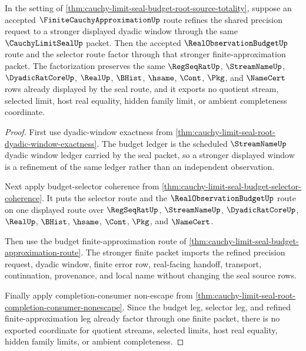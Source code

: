 \begin{theorem}
\label{thm:cauchy-limit-seal-root-budget-finite-approximation-cofinality}
In the setting of \autoref{thm:cauchy-limit-seal-budget-root-source-totality}, suppose an accepted $\FiniteCauchyApproximationUp$ route refines the shared precision request to a stronger displayed dyadic window through the same $\CauchyLimitSealUp$ packet. Then the accepted $\RealObservationBudgetUp$ route and the selector route factor through that stronger finite-approximation packet. The factorization preserves the same $\RegSeqRatUp$, $\StreamNameUp$, $\DyadicRatCoreUp$, $\RealUp$, $\BHist$, $\hsame$, $\Cont$, $\Pkg$, and $\NameCert$ rows already displayed by the seal route, and it exports no quotient stream, selected limit, host real equality, hidden family limit, or ambient completeness coordinate.
\end{theorem}
\begin{proof}
First use dyadic-window exactness from \autoref{thm:cauchy-limit-seal-root-dyadic-window-exactness}. The budget ledger is the scheduled $\StreamNameUp$ dyadic window ledger carried by the seal packet, so a stronger displayed window is a refinement of the same ledger rather than an independent observation.

Next apply budget-selector coherence from \autoref{thm:cauchy-limit-seal-budget-selector-coherence}. It puts the selector route and the $\RealObservationBudgetUp$ route on one displayed route over $\RegSeqRatUp$, $\StreamNameUp$, $\DyadicRatCoreUp$, $\RealUp$, $\BHist$, $\hsame$, $\Cont$, $\Pkg$, and $\NameCert$.

Then use the budget finite-approximation route of \autoref{thm:cauchy-limit-seal-budget-approximation-route}. The stronger finite packet imports the refined precision request, dyadic window, finite error row, real-facing handoff, transport, continuation, provenance, and local name without changing the seal source rows.

Finally apply completion-consumer non-escape from \autoref{thm:cauchy-limit-seal-root-completion-consumer-nonescape}. Since the budget leg, selector leg, and refined finite-approximation leg already factor through one finite packet, there is no exported coordinate for quotient streams, selected limits, host real equality, hidden family limits, or ambient completeness.
\end{proof}

